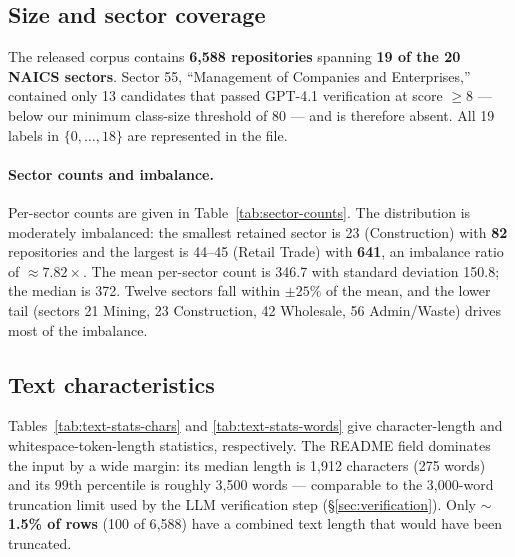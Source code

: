 \documentclass{article}
\begin{document}
\subsection{Size and sector coverage}
\label{sec:desc:size}

The released corpus contains \textbf{6{,}588 repositories} spanning
\textbf{19 of the 20 NAICS sectors}. Sector 55, ``Management of
Companies and Enterprises,'' contained only 13 candidates that passed
GPT-4.1 verification at score $\geq 8$ --- below our minimum
class-size threshold of 80 --- and is therefore absent. All 19
labels in $\{0,\ldots,18\}$ are represented in the file.

\paragraph{Sector counts and imbalance.}
Per-sector counts are given in Table~\ref{tab:sector-counts}. The
distribution is moderately imbalanced: the smallest retained sector
is 23 (Construction) with \textbf{82} repositories and the largest is
44--45 (Retail Trade) with \textbf{641}, an imbalance ratio of
$\approx 7.82\times$. The mean per-sector count is 346.7 with
standard deviation 150.8; the median is 372. Twelve sectors fall
within $\pm 25\%$ of the mean, and the lower tail (sectors 21
Mining, 23 Construction, 42 Wholesale, 56 Admin/Waste) drives most
of the imbalance.

\begin{table}[ht]
\centering
\caption{Per-sector counts in the released NAICS-GH training corpus
($n=6{,}588$) drawn from
\texttt{train\_data\_gpt\_ab8\_score\_with\_code.parquet}. Sector 55
(``Management of Companies and Enterprises'') is not present because
only 13 candidates passed GPT-4.1 verification, below the 80-sample
minimum-class-size threshold.}
\label{tab:sector-counts}
\small

\end{table}


\subsection{Text characteristics}
\label{sec:desc:text}

Tables~\ref{tab:text-stats-chars} and \ref{tab:text-stats-words} give
character-length and whitespace-token-length statistics, respectively.
The README field dominates the input by a wide margin: its median
length is 1{,}912 characters (275 words) and its 99th percentile is
roughly 3{,}500 words --- comparable to the 3{,}000-word truncation
limit used by the LLM verification step (\S\ref{sec:verification}).
Only \textbf{$\sim$1.5\% of rows} (100 of 6{,}588) have a combined
text length that would have been truncated.
\end{document}
